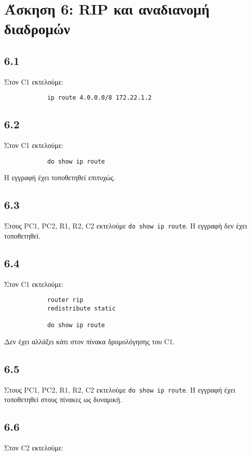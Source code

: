 \documentclass[a4paper, 12pt]{article}
\begin{document}
\section*{Άσκηση 6: RIP και αναδιανομή διαδρομών}

	\subsection*{6.1}
		Στον C1 εκτελούμε:
		
		\begin{verbatim}
			ip route 4.0.0.0/8 172.22.1.2
		\end{verbatim}

	\subsection*{6.2}
		Στον C1 εκτελούμε:
		
		\begin{verbatim}
			do show ip route
		\end{verbatim}
		
		Η εγγραφή έχει τοποθετηθεί επιτυχώς.

	\subsection*{6.3}
		Στους PC1, PC2, R1, R2, C2 εκτελούμε \verb|do show ip route|. Η εγγραφή δεν έχει τοποθετηθεί.

	\subsection*{6.4}
		Στον C1 εκτελούμε:
		
		\begin{verbatim}
			router rip
			redistribute static
		
			do show ip route
		\end{verbatim}
		
		Δεν έχει αλλάξει κάτι στον πίνακα δρομολόγησης του C1.

	\subsection*{6.5}
		Στους PC1, PC2, R1, R2, C2 εκτελούμε \verb|do show ip route|. Η εγγραφή έχει τοποθετηθεί στους πίνακες ως δυναμική.

	\subsection*{6.6}
		Στον C2 εκτελούμε:
		
\end{document}
